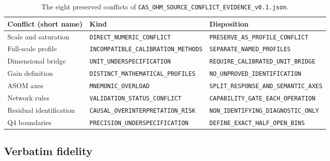 \begin{table}[htbp]
\centering\small
\begin{tabular}{@{}lll@{}}
\toprule
Conflict (short name) & Kind & Disposition \\
\midrule
Scale and saturation & \texttt{DIRECT\_NUMERIC\_CONFLICT} &
\texttt{PRESERVE\_AS\_PROFILE\_CONFLICT} \\
Full-scale profile & \texttt{INCOMPATIBLE\_CALIBRATION\_METHODS} &
\texttt{SEPARATE\_NAMED\_PROFILES} \\
Dimensional bridge & \texttt{UNIT\_UNDERSPECIFICATION} &
\texttt{REQUIRE\_CALIBRATED\_UNIT\_BRIDGE} \\
Gain definition & \texttt{DISTINCT\_MATHEMATICAL\_PROFILES} &
\texttt{NO\_UNPROVED\_IDENTIFICATION} \\
ASOM axes & \texttt{MNEMONIC\_OVERLOAD} &
\texttt{SPLIT\_RESPONSE\_AND\_SEMANTIC\_AXES} \\
Network rules & \texttt{VALIDATION\_STATUS\_CONFLICT} &
\texttt{CAPABILITY\_GATE\_EACH\_OPERATION} \\
Residual identification & \texttt{CAUSAL\_OVERINTERPRETATION\_RISK} &
\texttt{NON\_IDENTIFYING\_DIAGNOSTIC\_ONLY} \\
Q4 boundaries & \texttt{PRECISION\_UNDERSPECIFICATION} &
\texttt{DEFINE\_EXACT\_HALF\_OPEN\_BINS} \\
\bottomrule
\end{tabular}
\caption{The eight preserved conflicts of
\texttt{CAS\_OHM\_SOURCE\_CONFLICT\_EVIDENCE\_v0.1.json}.}
\label{ch04:tab:overview}
\end{table}

\subsection{Verbatim fidelity}\label{ch04:fidelity}

